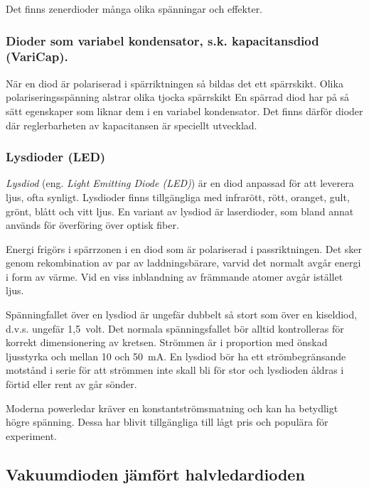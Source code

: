   Det finns zenerdioder många olika spänningar och effekter.

\subsubsection{Dioder som variabel kondensator, s.k. kapacitansdiod (VariCap).}
\label{varicap}

  När en diod är polariserad i spärriktningen så bildas det ett spärrskikt.
  Olika polariseringsspänning alstrar olika tjocka spärrskikt En spärrad diod
  har på så sätt egenskaper som liknar dem i en variabel kondensator. Det finns
  därför dioder där reglerbarheten av kapacitansen är speciellt utvecklad.

\subsubsection{Lysdioder (LED)}

\emph{Lysdiod} (eng. \emph{Light Emitting Diode (LED)}) är en diod anpassad för
att leverera ljus, ofta synligt.
Lysdioder finns tillgängliga med infrarött, rött, oranget, gult, grönt,
blått och vitt ljus.
En variant av lysdiod är laserdioder, som bland annat används för överföring
över optisk fiber.

Energi frigörs i spärrzonen i en diod som är polariserad i passriktningen.
Det sker genom rekombination av par av laddningsbärare, varvid det normalt avgår
energi i form av värme.
Vid en viss inblandning av främmande atomer avgår istället ljus.

Spänningfallet över en lysdiod är ungefär dubbelt så stort som över en
kiseldiod, d.v.s. ungefär 1,5~volt.
Det normala spänningsfallet bör alltid kontrolleras för korrekt dimensionering
av kretsen.
Strömmen är i proportion med önskad ljusstyrka och mellan 10 och 50~mA.
En lysdiod bör ha ett strömbegränsande motstånd i serie för att strömmen
inte skall bli för stor och lysdioden åldras i förtid eller rent av går
sönder.

Moderna powerledar kräver en konstantströmsmatning och kan ha betydligt
högre spänning.
Dessa har blivit tillgängliga till lågt pris och populära för experiment.

\subsection{Vakuumdioden jämfört halvledardioden}

